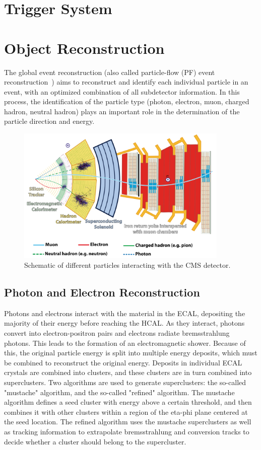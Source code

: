 \section{Trigger System}

\section{Object Reconstruction}
The global event reconstruction (also called particle-flow (PF) event reconstruction~\cite{CMS:2017yfk}) aims to reconstruct and identify each individual particle in an event, with an optimized combination of all subdetector information. In this process, the identification of the particle type (photon, electron, muon, charged hadron, neutral hadron) plays an important role in the determination of the particle direction and energy.

\begin{figure}
  \centering
   \includegraphics[width=0.9\textwidth]{fig/experiment/reconstruction/cms_detector.png}
	\caption{Schematic of different particles interacting with the CMS detector.}
\end{figure}

\subsection{Photon and Electron Reconstruction}
Photons and electrons interact with the material in the ECAL, depositing the majority of their energy before reaching the HCAL. As they interact, photons convert into 
electron-positron pairs and electrons radiate bremsstrahlung photons. This leads to the formation of an electromagnetic shower. Because of this, the original particle energy 
is split into multiple energy deposits, which must be combined to reconstruct the original energy. Deposits in individual ECAL crystals are combined into clusters, 
and these clusters are in turn combined into superclusters. Two algorithms are used to generate superclusters: the so-called "mustache" algorithm, and the so-called "refined" algorithm.
The mustache algorithm defines a seed cluster with energy above a certain threshold, and then combines it with other clusters within a region of the eta-phi plane centered at the 
seed location. The refined algorithm uses the mustache superclusters as well as tracking information to extrapolate bremsstrahlung and conversion tracks to decide whether a cluster should belong 
to the supercluster. 

